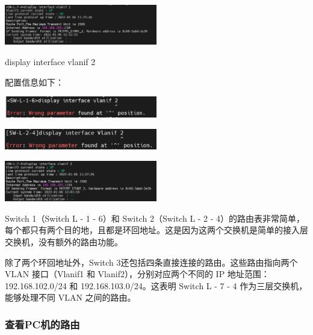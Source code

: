 \documentclass{article}
\begin{document}
\vspace{10pt}
\centerline{\includegraphics[width=0.5\textwidth]{3_1_images/15.png}}
\vspace{10pt}

display interface vlanif 2

配置信息如下：

\vspace{10pt}
\centerline{\includegraphics[width=0.5\textwidth]{3_1_images/16.png}}
\vspace{10pt}

\vspace{10pt}
\centerline{\includegraphics[width=0.5\textwidth]{3_1_images/17.png}}
\vspace{10pt}

\vspace{10pt}
\centerline{\includegraphics[width=0.5\textwidth]{3_1_images/18.png}}
\vspace{10pt}

Switch 1（Switch L - 1 - 6）和 Switch 2（Switch L - 2 - 4）的路由表非常简单，每个都只有两个目的地，且都是环回地址。这是因为这两个交换机是简单的接入层交换机，没有额外的路由功能。

除了两个环回地址外，Switch 3还包括四条直接连接的路由。这些路由指向两个 VLAN 接口（Vlanif1 和 Vlanif2），分别对应两个不同的 IP 地址范围：192.168.102.0/24 和 192.168.103.0/24。这表明 Switch L - 7 - 4 作为三层交换机，能够处理不同 VLAN 之间的路由。

\subsubsection{查看PC机的路由}
\end{document}
